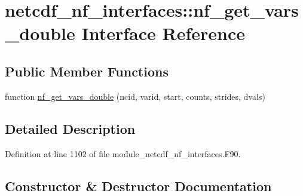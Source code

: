 \hypertarget{interfacenetcdf__nf__interfaces_1_1nf__get__vars__double}{}\section{netcdf\+\_\+nf\+\_\+interfaces\+:\+:nf\+\_\+get\+\_\+vars\+\_\+double Interface Reference}
\label{interfacenetcdf__nf__interfaces_1_1nf__get__vars__double}
\subsection*{Public Member Functions}
\begin{DoxyCompactItemize}
\item 
function \hyperlink{interfacenetcdf__nf__interfaces_1_1nf__get__vars__double_adc3ae8594081cc39cd2e1aab768cf280}{nf\+\_\+get\+\_\+vars\+\_\+double} (ncid, varid, start, counts, strides, dvals)
\end{DoxyCompactItemize}


\subsection{Detailed Description}


Definition at line 1102 of file module\+\_\+netcdf\+\_\+nf\+\_\+interfaces.\+F90.



\subsection{Constructor \& Destructor Documentation}
\mbox{\label{interfacenetcdf__nf__interfaces_1_1nf__get__vars__double_adc3ae8594081cc39cd2e1aab768cf280}} 
